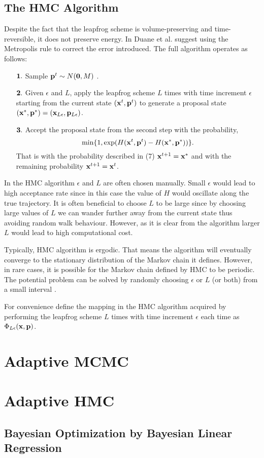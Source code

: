 \documentclass{article} %
\begin{document}
\subsection{The HMC Algorithm}
Despite the fact that the leapfrog scheme is volume-preserving and time-reversible, it does not preserve energy. In \cite{duane1987hybrid} Duane et al. suggest using the Metropolis rule to correct the error introduced. The full algorithm operates as follows:
\begin{itemize}
 \item[${\bf 1.}$]Sample ${\bf p}^{t} \sim N({\bf 0}, M)$ .
 \item[${\bf 2.}$]Given $\epsilon$ and $L$, apply the leapfrog scheme $L$ times with time increment $\epsilon$ starting from the current state $({\bf x}^{t},{\bf p}^{t})$ to generate a proposal state $({\bf x}^{*},{\bf p}^{*}) = ({\bf x}_{L\epsilon},{\bf p}_{L\epsilon})$.
 \item[${\bf 3.}$]Accept the proposal state from the second step with the probability,
\begin{equation} 
 \min\{1, \exp(H({\bf x}^{t},{\bf p}^{t}) - H({\bf x}^{*},{\bf p}^{*}))\}.
\end{equation}
That is with the probability described in (7) ${\bf x}^{t+1} = {\bf x}^{*}$ and with the remaining probability ${\bf x}^{t+1} = {\bf x}^{t}$.
\end{itemize}
In the HMC algorithm $\epsilon$ and $L$ are often chosen manually. Small $\epsilon$ would lead to high acceptance rate since in this case the value of $H$ would oscillate along the true trajectory. It is often beneficial to choose $L$ to be large since by choosing large values of $L$ we can wander further away from the current state thus avoiding random walk behaviour. However, as it is clear from the algorithm larger $L$ would lead to high computational cost.

Typically, HMC algorithm is ergodic. That means the algorithm will eventually converge to the stationary distribution of the Markov chain it defines. However, in rare cases, it is possible for the Markov chain defined by HMC to be periodic. The potential problem can be solved by randomly choosing $\epsilon$ or $L$ (or both) from a small interval \cite{mackenzie1989improved}.

For convenience define the mapping in the HMC algorithm acquired by performing the leapfrog scheme $L$ times with time increment $\epsilon$ each time as $\Phi_{L \epsilon}({\bf x},{\bf p})$.
\section{Adaptive MCMC}

\section{Adaptive HMC}

\subsection{Bayesian Optimization by Bayesian Linear Regression}



\small{
{}

}
\end{document}
